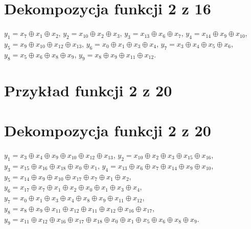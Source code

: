 \section*{Dekompozycja funkcji 2 z 16}
\label{file:2outof16.txt}
\noindent
$y_1 = x_7 \oplus x_1 \oplus x_2$, \newline
$y_2 = x_{10} \oplus x_2 \oplus x_3$, \newline
$y_3 = x_{13} \oplus x_6 \oplus x_7$, \newline
$y_4 = x_{14} \oplus x_9 \oplus x_{10}$, \newline
$y_5 = x_9 \oplus x_{10} \oplus x_{12} \oplus x_{13}$, \newline
$y_6 = x_0 \oplus x_1 \oplus x_3 \oplus x_4$, \newline
$y_7 = x_3 \oplus x_4 \oplus x_5 \oplus x_6$, \newline
$y_8 = x_5 \oplus x_6 \oplus x_8 \oplus x_9$, \newline
$y_9 = x_8 \oplus x_9 \oplus x_{11} \oplus x_{12}$. \newline

\clearpage

\section*{Przykład funkcji 2 z 20}
\label{file:2outof20.pla}

\clearpage

\section*{Dekompozycja funkcji 2 z 20}
\label{file:2outof20.txt}
\noindent
$y_1 = x_3 \oplus x_4 \oplus x_9 \oplus x_{10} \oplus x_{12} \oplus x_{13}$, \newline
$y_2 = x_{10} \oplus x_2 \oplus x_3 \oplus x_{15} \oplus x_{16}$, \newline
$y_3 = x_{15} \oplus x_{16} \oplus x_{18} \oplus x_0 \oplus x_1$,  \newline
$y_4 = x_{13} \oplus x_6 \oplus x_7 \oplus x_{14} \oplus x_9 \oplus x_{10}$,  \newline
$y_5 = x_{14} \oplus x_9 \oplus x_{10} \oplus x_{17} \oplus x_7 \oplus x_1 \oplus x_2$,  \newline
$y_6 = x_{17} \oplus x_7 \oplus x_1 \oplus x_2 \oplus x_0 \oplus x_1 \oplus x_3 \oplus x_4$,  \newline
$y_7 = x_0 \oplus x_1 \oplus x_3 \oplus x_4 \oplus x_8 \oplus x_9 \oplus x_{11} \oplus x_{12}$,  \newline
$y_8 = x_8 \oplus x_9 \oplus x_{11} \oplus x_{12} \oplus x_{11} \oplus x_{12} \oplus x_{16} \oplus x_{17}$,  \newline
$y_9 = x_{11} \oplus x_{12} \oplus x_{16} \oplus x_{17} \oplus x_{18} \oplus x_0 \oplus x_1 \oplus x_5 \oplus x_6 \oplus x_8 \oplus x_9$. \newline

\clearpage